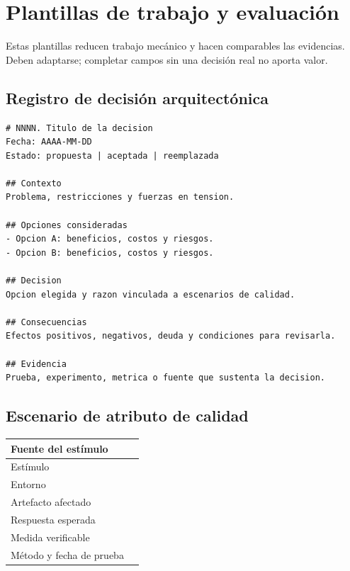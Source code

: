 \chapter{Plantillas de trabajo y evaluación}
\label{ap:plantillas}

Estas plantillas reducen trabajo mecánico y hacen comparables las evidencias. Deben adaptarse; completar campos sin una decisión real no aporta valor.

\section{Registro de decisión arquitectónica}

\begin{lstlisting}[caption={docs/adr/NNNN-titulo.md}]
# NNNN. Titulo de la decision
Fecha: AAAA-MM-DD
Estado: propuesta | aceptada | reemplazada

## Contexto
Problema, restricciones y fuerzas en tension.

## Opciones consideradas
- Opcion A: beneficios, costos y riesgos.
- Opcion B: beneficios, costos y riesgos.

## Decision
Opcion elegida y razon vinculada a escenarios de calidad.

## Consecuencias
Efectos positivos, negativos, deuda y condiciones para revisarla.

## Evidencia
Prueba, experimento, metrica o fuente que sustenta la decision.
\end{lstlisting}

\section{Escenario de atributo de calidad}

\begin{center}
\begin{tabularx}{0.94\textwidth}{p{3.3cm}X}
\toprule
Fuente del estímulo & \\[0.45cm]\midrule
Estímulo & \\[0.45cm]\midrule
Entorno & \\[0.45cm]\midrule
Artefacto afectado & \\[0.45cm]\midrule
Respuesta esperada & \\[0.45cm]\midrule
Medida verificable & \\[0.45cm]\midrule
Método y fecha de prueba & \\[0.45cm]
\bottomrule
\end{tabularx}
\end{center}

